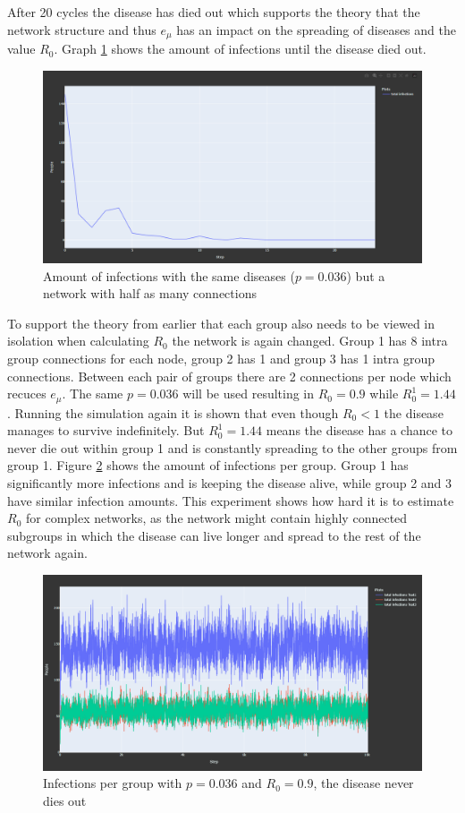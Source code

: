 After 20 cycles the disease has died out which supports the theory that the network structure and thus $e_\mu$ has an impact on the spreading of diseases and the value $R_0$. Graph \ref{fig:exp_change_network} shows the amount of infections until the disease died out.

\begin{figure}
    \centering
    \includegraphics[width=0.5\linewidth]{images/exp_changed_network.png}
    \caption{Amount of infections with the same diseases ($p = 0.036$) but a network with half as many connections}
    \label{fig:exp_change_network}
\end{figure}

To support the theory from earlier that each group also needs to be viewed in isolation when calculating $R_0$ the network is again changed. Group 1 has 8 intra group connections for each node, group 2 has 1 and group 3 has 1 intra group connections. Between each pair of groups there are 2 connections per node which recuces $e_\mu$. The same $p = 0.036$ will be used resulting in $R_0 = 0.9$ while $R_0^1 = 1.44$. Running the simulation again it is shown that even though $R_0 < 1$ the disease manages to survive indefinitely. But $R_0^1 = 1.44$ means the disease has a chance to never die out within group 1 and is constantly spreading to the other groups from group 1. Figure \ref{fig:exp_subgroups} shows the amount of infections per group. Group 1 has significantly more infections and is keeping the disease alive, while group 2 and 3 have similar infection amounts. This experiment shows how hard it is to estimate $R_0$ for complex networks, as the network might contain highly connected subgroups in which the disease can live longer and spread to the rest of the network again.

\begin{figure}
    \centering
    \includegraphics[width=0.5\linewidth]{images/exp_subgroups.png}
    \caption{Infections per group with $p = 0.036$ and $R_0 = 0.9$, the disease never dies out}
    \label{fig:exp_subgroups}
\end{figure}


